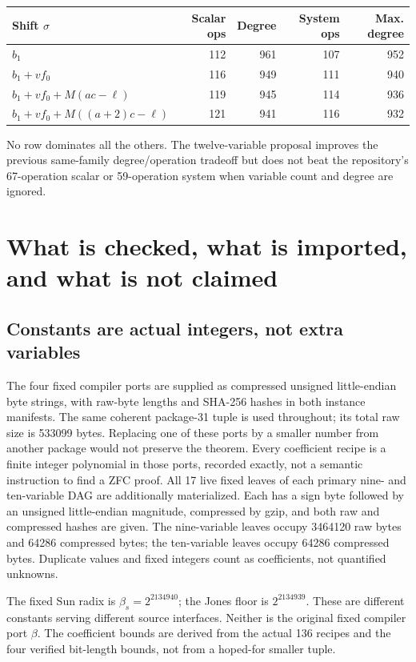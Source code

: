 \documentclass[11pt]{article}
\begin{document}
\begin{center}
\begin{tabular}{lrrrr}\toprule
Shift $\sigma$ & Scalar ops & Degree & System ops & Max. degree\\\midrule
$b_1$ &112&961&107&952\\
$b_1+vf_0$ &116&949&111&940\\
$b_1+vf_0+M(ac-\ell)$ &119&945&114&936\\
$b_1+vf_0+M((a+2)c-\ell)$ &121&941&116&932\\\bottomrule
\end{tabular}
\end{center}
No row dominates all the others. The twelve-variable proposal improves the
previous same-family degree/operation tradeoff but does not beat the repository's
67-operation scalar or 59-operation system when variable count and degree
are ignored.

\section{What is checked, what is imported, and what is not claimed}
\subsection{Constants are actual integers, not extra variables}
The four fixed compiler ports are supplied as compressed unsigned
little-endian byte strings, with raw-byte lengths and SHA-256 hashes in both
instance manifests. The same coherent package-31 tuple is used throughout;
its total raw size is 533099 bytes. Replacing one of these ports by a smaller
number from another package would not preserve the theorem.
Every coefficient recipe is a finite integer polynomial in those ports,
recorded exactly, not a semantic instruction to find a ZFC proof. All 17
live fixed leaves of each primary nine- and ten-variable DAG are additionally
materialized. Each has a sign byte followed by an unsigned little-endian
magnitude, compressed by gzip, and both raw and compressed hashes are given.
The nine-variable leaves occupy 3464120 raw bytes and 64286 compressed bytes;
the ten-variable leaves occupy 64286 compressed bytes. Duplicate values and
fixed integers count as coefficients, not quantified unknowns.

The fixed Sun radix is $\beta_s=2^{2134940}$; the Jones floor is
$2^{2134939}$. These are different constants serving different source
interfaces. Neither is the original fixed compiler port $\beta$.
The coefficient bounds are derived from the actual 136 recipes and the four
verified bit-length bounds, not from a hoped-for smaller tuple.
\end{document}
